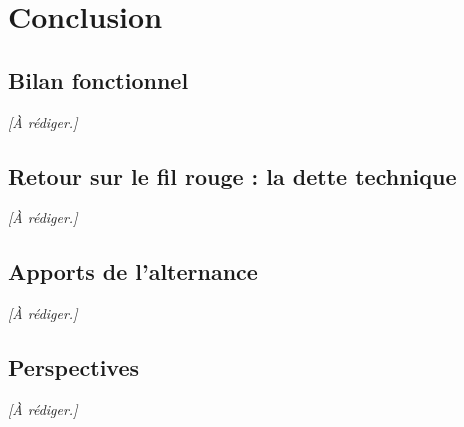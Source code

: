 \chapter{Conclusion}
\label{chap:conclusion}


\section{Bilan fonctionnel}
\emph{[À rédiger.]}

\section{Retour sur le fil rouge : la dette technique}
\emph{[À rédiger.]}

\section{Apports de l'alternance}
\emph{[À rédiger.]}

\section{Perspectives}
\emph{[À rédiger.]}
